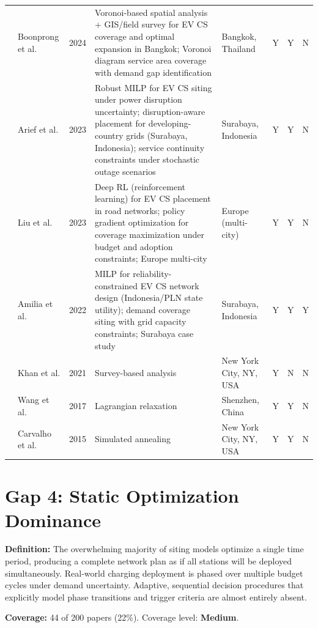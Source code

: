 \documentclass[letterpaper, 12pt, oneside, doublespacing]{Thesis}
\begin{document}
\begin{longtable}{L{0.9cm} L{1.8cm} L{0.7cm} L{2.5cm} L{2.1cm} L{0.7cm} L{0.7cm} L{0.7cm}}
\cite{towards_sustainable_2024} & Boonprong et al. & 2024 & Voronoi-based spatial analysis + GIS/field survey for EV CS coverage and optimal expansion in Bangkok; Voronoi diagram service area coverage with demand gap identification & Bangkok, Thailand & Y & Y & N \\
\cite{a_robust_2023} & Arief et al. & 2023 & Robust MILP for EV CS siting under power disruption uncertainty; disruption-aware placement for developing-country grids (Surabaya, Indonesia); service continuity constraints under stochastic outage scenarios & Surabaya, Indonesia & Y & Y & N \\
\cite{optimal_placement_2023} & Liu et al. & 2023 & Deep RL (reinforcement learning) for EV CS placement in road networks; policy gradient optimization for coverage maximization under budget and adoption constraints; Europe multi-city & Europe (multi-city) & Y & Y & N \\
\cite{designing_an_2022} & Amilia et al. & 2022 & MILP for reliability-constrained EV CS network design (Indonesia/PLN state utility); demand coverage siting with grid capacity constraints; Surabaya case study & Surabaya, Indonesia & Y & Y & Y \\
\cite{inequitable_access_2021} & Khan et al. & 2021 & Survey-based analysis & New York City, NY, USA & Y & N & N \\
\cite{electrical_vehicle_2017} & Wang et al. & 2017 & Lagrangian relaxation & Shenzhen, China & Y & Y & N \\
\cite{critical_behaviour_2015} & Carvalho et al. & 2015 & Simulated annealing & New York City, NY, USA & Y & Y & N \\
\bottomrule
\end{longtable}


\section{Gap 4: Static Optimization Dominance}


\noindent \textbf{Definition:} The overwhelming majority of siting models optimize a single time period, producing a complete network plan as if all stations will be deployed simultaneously. Real-world charging deployment is phased over multiple budget cycles under demand uncertainty. Adaptive, sequential decision procedures that explicitly model phase transitions and trigger criteria are almost entirely absent.



\noindent \textbf{Coverage:} 44 of 200 papers (22\%). Coverage level: \textbf{Medium}.
\end{document}
